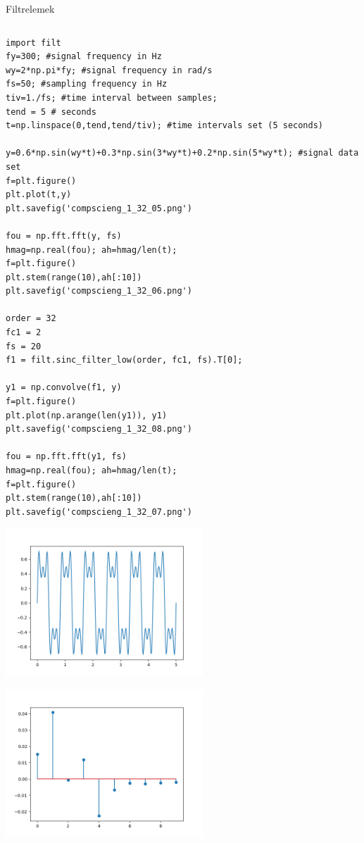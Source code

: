 \documentclass[12pt,fleqn]{article}\usepackage{../../common}
\begin{document}
Filtrelemek

\inputminted[fontsize=\footnotesize]{python}{filt.py}

\begin{verbatim}
import filt
fy=300; #signal frequency in Hz
wy=2*np.pi*fy; #signal frequency in rad/s
fs=50; #sampling frequency in Hz
tiv=1./fs; #time interval between samples;
tend = 5 # seconds
t=np.linspace(0,tend,tend/tiv); #time intervals set (5 seconds)

y=0.6*np.sin(wy*t)+0.3*np.sin(3*wy*t)+0.2*np.sin(5*wy*t); #signal data set
f=plt.figure()
plt.plot(t,y)
plt.savefig('compscieng_1_32_05.png')

fou = np.fft.fft(y, fs)
hmag=np.real(fou); ah=hmag/len(t);
f=plt.figure()
plt.stem(range(10),ah[:10])
plt.savefig('compscieng_1_32_06.png')

order = 32
fc1 = 2
fs = 20
f1 = filt.sinc_filter_low(order, fc1, fs).T[0];

y1 = np.convolve(f1, y)
f=plt.figure()
plt.plot(np.arange(len(y1)), y1)
plt.savefig('compscieng_1_32_08.png')

fou = np.fft.fft(y1, fs)
hmag=np.real(fou); ah=hmag/len(t);
f=plt.figure()
plt.stem(range(10),ah[:10])
plt.savefig('compscieng_1_32_07.png')
\end{verbatim}

\includegraphics[width=20em]{compscieng_1_32_05.png}

\includegraphics[width=20em]{compscieng_1_32_06.png}
\end{document}
